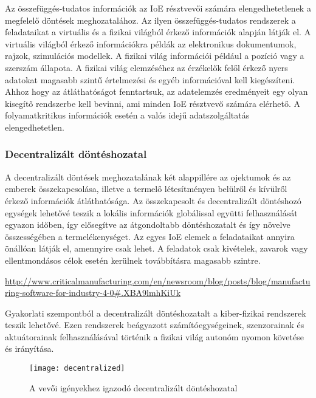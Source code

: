 \documentclass[../documentation.tex]{subfiles}
\begin{document}
Az összefüggés-tudatos információk az IoE résztvevői számára elengedhetetlenek a megfelelő döntések meghozatalához. Az ilyen összefüggés-tudatos rendszerek a feladataikat a virtuális és a fizikai világból érkező információk alapján látják el. A virtuális világból érkező információkra példák az elektronikus dokumentumok, rajzok, szimulációs modellek. A fizikai világ információi például a pozíció vagy a szerszám állapota. A fizikai világ elemzéséhez az érzékelők felől érkező nyers adatokat magasabb szintű értelmezési és egyéb információval kell kiegészíteni. Ahhoz hogy az átláthatóságot fenntartsuk, az adatelemzés eredményeit egy olyan kisegítő rendszerbe kell bevinni, ami minden IoE résztvevő számára elérhető. A folyamatkritikus információk esetén a valós idejű adatszolgáltatás elengedhetetlen.

\subsubsection{Decentralizált döntéshozatal}
A decentralizált döntések meghozatalának két alappillére az ojektumok és az emberek összekapcsolása, illetve a termelő létesítményen belülről és kívülről érkező információk átláthatósága. Az összekapcsolt és decentralizált döntéshozó egységek lehetővé teszik a lokális információk globálissal együtti felhasználását egyazon időben, így elősegítve az átgondoltabb döntéshozatalt és így növelve összességében a termelékenységet. Az egyes IoE elemek a feladataikat annyira önállóan látják el, amennyire csak lehet. A feladatok csak kivételek, zavarok vagy ellentmondásos célok esetén kerülnek továbbításra magasabb szintre.

\urldef\myurl\url{http://www.criticalmanufacturing.com/en/newsroom/blog/posts/blog/manufacturing-software-for-industry-4-0#.XBA9lmhKiUk}

Gyakorlati szempontból a decentralizált döntéshozatalt a kiber-fizikai rendszerek teszik lehetővé. Ezen rendszerek beágyazott számítóegységeinek, szenzorainak és aktuátorainak felhasználásával történik a fizikai világ autonóm nyomon követése és irányítása. 

\begin{figure}[h]
\centering
\texttt{[image: decentralized]}
\caption{A vevői igényekhez igazodó decentralizált döntéshozatal\protect\footnotemark}
\label{fig:decentralized}
\end{figure}
\end{document}
